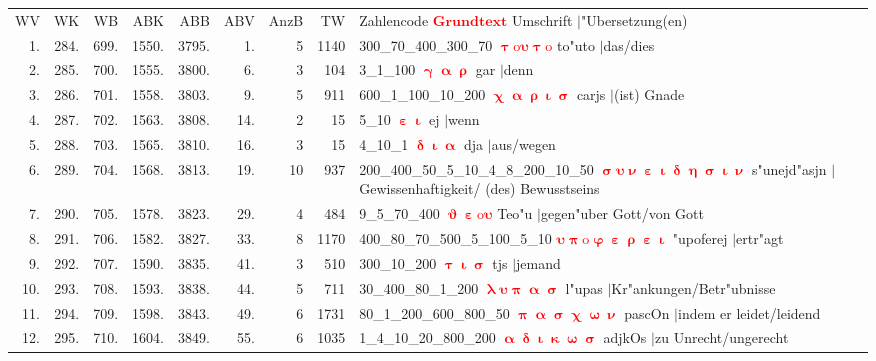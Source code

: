 \documentclass[a4paper,10pt,landscape]{article}
\begin{document}
\begin{tabular}{rrrrrrrrp{120mm}}
WV&WK&WB&ABK&ABB&ABV&AnzB&TW&Zahlencode \textcolor{red}{$\boldsymbol{Grundtext}$} Umschrift $|$"Ubersetzung(en)\\
1.&284.&699.&1550.&3795.&1.&5&1140&300\_70\_400\_300\_70 \textcolor{red}{$\boldsymbol{\uptau\mathrm{o}\upsilon\uptau\mathrm{o}}$} to"uto $|$das/dies\\
2.&285.&700.&1555.&3800.&6.&3&104&3\_1\_100 \textcolor{red}{$\boldsymbol{\upgamma\upalpha\uprho}$} gar $|$denn\\
3.&286.&701.&1558.&3803.&9.&5&911&600\_1\_100\_10\_200 \textcolor{red}{$\boldsymbol{\upchi\upalpha\uprho\upiota\upsigma}$} carjs $|$(ist) Gnade\\
4.&287.&702.&1563.&3808.&14.&2&15&5\_10 \textcolor{red}{$\boldsymbol{\upepsilon\upiota}$} ej $|$wenn\\
5.&288.&703.&1565.&3810.&16.&3&15&4\_10\_1 \textcolor{red}{$\boldsymbol{\updelta\upiota\upalpha}$} dja $|$aus/wegen\\
6.&289.&704.&1568.&3813.&19.&10&937&200\_400\_50\_5\_10\_4\_8\_200\_10\_50 \textcolor{red}{$\boldsymbol{\upsigma\upsilon\upnu\upepsilon\upiota\updelta\upeta\upsigma\upiota\upnu}$} s"unejd"asjn $|$Gewissenhaftigkeit/ (des) Bewusstseins\\
7.&290.&705.&1578.&3823.&29.&4&484&9\_5\_70\_400 \textcolor{red}{$\boldsymbol{\upvartheta\upepsilon\mathrm{o}\upsilon}$} Teo"u $|$gegen"uber Gott/von Gott\\
8.&291.&706.&1582.&3827.&33.&8&1170&400\_80\_70\_500\_5\_100\_5\_10 \textcolor{red}{$\boldsymbol{\upsilon\uppi\mathrm{o}\upvarphi\upepsilon\uprho\upepsilon\upiota}$} "upoferej $|$ertr"agt\\
9.&292.&707.&1590.&3835.&41.&3&510&300\_10\_200 \textcolor{red}{$\boldsymbol{\uptau\upiota\upsigma}$} tjs $|$jemand\\
10.&293.&708.&1593.&3838.&44.&5&711&30\_400\_80\_1\_200 \textcolor{red}{$\boldsymbol{\uplambda\upsilon\uppi\upalpha\upsigma}$} l"upas $|$Kr"ankungen/Betr"ubnisse\\
11.&294.&709.&1598.&3843.&49.&6&1731&80\_1\_200\_600\_800\_50 \textcolor{red}{$\boldsymbol{\uppi\upalpha\upsigma\upchi\upomega\upnu}$} pascOn $|$indem er leidet/leidend\\
12.&295.&710.&1604.&3849.&55.&6&1035&1\_4\_10\_20\_800\_200 \textcolor{red}{$\boldsymbol{\upalpha\updelta\upiota\upkappa\upomega\upsigma}$} adjkOs $|$zu Unrecht/ungerecht\\
\end{tabular}\medskip \\
\end{document}
